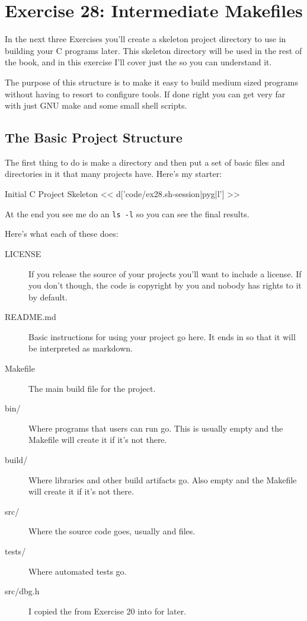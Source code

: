 \chapter{Exercise 28: Intermediate Makefiles}

In the next three Exercises you'll create a skeleton project directory to use
in building your C programs later.  This skeleton directory will be used in the
rest of the book, and in this exercise I'll cover just the  so
you can understand it.

The purpose of this structure is to make it easy to build medium sized programs
without having to resort to configure tools.  If done right you can get very far
with just GNU make and some small shell scripts.

\section{The Basic Project Structure}

The first thing to do is make a  directory and then put
a set of basic files and directories in it that many projects have.  Here's
my starter:

\begin{code}{Initial C Project Skeleton}
<< d['code/ex28.sh-session|pyg|l'] >>
\end{code}

At the end you see me do an \verb|ls -l| so you can see the final results.

Here's what each of these does:

\begin{description}
\item[LICENSE] If you release the source of your projects you'll want to 
    include a license.  If you don't though, the code is copyright by you
    and nobody has rights to it by default.
\item[README.md] Basic instructions for using your project go here.  It ends
    in  so that it will be interpreted as markdown.
\item[Makefile] The main build file for the project.
\item[bin/] Where programs that users can run go. This is usually empty and the Makefile will create it if it's not there.
\item[build/] Where libraries and other build artifacts go. Also empty and the Makefile will create it if it's not there.
\item[src/] Where the source code goes, usually  and  files.
\item[tests/] Where automated tests go.
\item[src/dbg.h] I copied the  from Exercise 20 into  for later.
\end{description}


